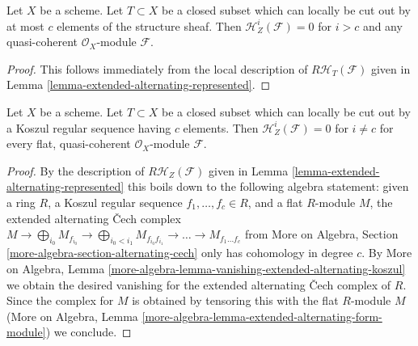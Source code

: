 \begin{lemma}
\label{lemma-supported-trivial-vanishing}
Let $X$ be a scheme. Let $T \subset X$ be a closed subset which can
locally be cut out by at most $c$ elements of the structure sheaf.
Then $\mathcal{H}^i_Z(\mathcal{F}) = 0$ for $i > c$ and any
quasi-coherent $\mathcal{O}_X$-module $\mathcal{F}$.
\end{lemma}

\begin{proof}
This follows immediately from the local description of
$R\mathcal{H}_T(\mathcal{F})$ given in
Lemma \ref{lemma-extended-alternating-represented}.
\end{proof}

\begin{lemma}
\label{lemma-supported-vanishing}
Let $X$ be a scheme. Let $T \subset X$ be a closed subset which can
locally be cut out by a Koszul regular sequence having $c$ elements.
Then $\mathcal{H}^i_Z(\mathcal{F}) = 0$ for $i \not = c$ for every
flat, quasi-coherent $\mathcal{O}_X$-module $\mathcal{F}$.
\end{lemma}

\begin{proof}
By the description of $R\mathcal{H}_Z(\mathcal{F})$ given in
Lemma \ref{lemma-extended-alternating-represented} this boils
down to the following algebra statement: given a ring $R$,
a Koszul regular sequence $f_1, \ldots, f_c \in R$, and a flat
$R$-module $M$, the extended alternating {\v C}ech complex
$M \to \bigoplus\nolimits_{i_0} M_{f_{i_0}} \to
\bigoplus\nolimits_{i_0 < i_1} M_{f_{i_0}f_{i_1}} \to
\ldots \to M_{f_1 \ldots f_c}$
from More on Algebra, Section \ref{more-algebra-section-alternating-cech}
only has cohomology in degree $c$. By More on Algebra, Lemma
\ref{more-algebra-lemma-vanishing-extended-alternating-koszul}
we obtain the desired vanishing for the extended alternating
{\v C}ech complex of $R$. Since the complex for $M$ is obtained
by tensoring this with the flat $R$-module $M$
(More on Algebra, Lemma
\ref{more-algebra-lemma-extended-alternating-form-module})
we conclude.
\end{proof}


